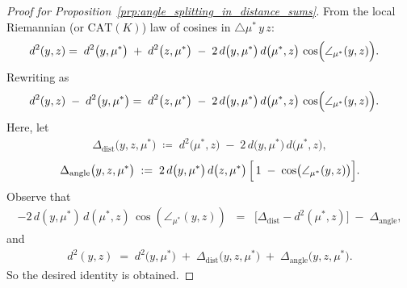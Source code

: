 \begin{proof}[Proof for Proposition~\ref{prp:angle_splitting_in_distance_sums}]
    From the local Riemannian (or \(\mathrm{CAT}(K)\)) law of cosines in \(\triangle \mu^*\,y\,z\):
    \begin{align*}
        d^2(y,z)
        &=\;
        d^2\bigl(y,\mu^*\bigr)
        \;+\;
        d^2\bigl(z,\mu^*\bigr)
        \;-\;
        2\,d\bigl(y,\mu^*\bigr)\,d\bigl(\mu^*,z\bigr)\,
        \cos\Bigl(\angle_{\mu^*}(y,z)\Bigr).
    \end{align*}
    Rewriting as
    \begin{align*}
        d^2(y,z) 
        \;-\;
        d^2\bigl(y,\mu^*\bigr)
        &=\;
        d^2\bigl(z,\mu^*\bigr)
        \;-\;
        2\,d\bigl(y,\mu^*\bigr)\,d\bigl(\mu^*,z\bigr)\,
        \cos\Bigl(\angle_{\mu^*}(y,z)\Bigr).
    \end{align*}
    Here, let
    \begin{align*}
        \Delta_{\mathrm{dist}}\bigl(y,z,\mu^*\bigr)
        \;\coloneqq\;
        d^2\bigl(\mu^*,z\bigr)
        \;-\;
        2\,d\bigl(y,\mu^*\bigr)\,d\bigl(\mu^*,z\bigr),
    \end{align*}
    \begin{align*}
        \Delta_{\mathrm{angle}}\bigl(y,z,\mu^*\bigr)
        \;:=\;
        2\,d\bigl(y,\mu^*\bigr)\,d\bigl(z,\mu^*\bigr)\,
        \Bigl[\,
        1
        \;-\;
        \cos\bigl(\angle_{\mu^*}(y,z)\bigr)
        \Bigr].
    \end{align*}
    Observe that
    \begin{align*}
        -2\,d(y,\mu^*)\,d(\mu^*,z)\,\cos(\angle_{\mu^*}(y,z))
        \;\;=\;\;
        \bigl[\Delta_{\mathrm{dist}} - d^2(\mu^*,z)\bigr]
        \;-\;
        \Delta_{\mathrm{angle}},
    \end{align*}
    and
    \begin{align*}
        d^2(y,z)
        \;=\;
        d^2\bigl(y,\mu^*\bigr)
        \;+\;
        \Delta_{\mathrm{dist}}\bigl(y,z,\mu^*\bigr)
        \;+\;
        \Delta_{\mathrm{angle}}\bigl(y,z,\mu^*\bigr).
    \end{align*}
    So the desired identity is obtained.
\end{proof}

